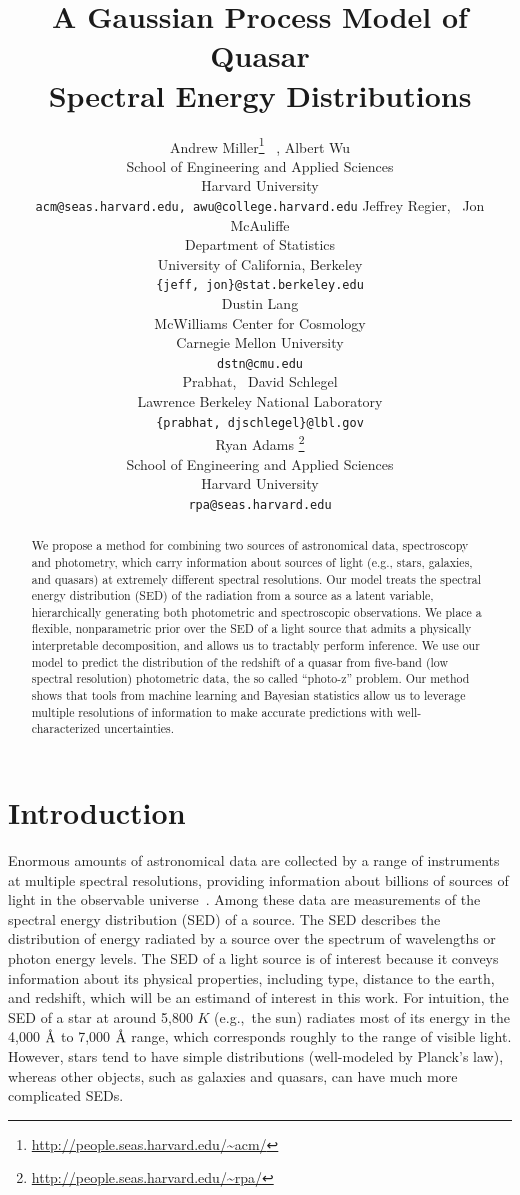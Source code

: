 \documentclass{article} %
\title{A Gaussian Process Model of Quasar \\ Spectral Energy Distributions}
\author{
Andrew Miller\thanks{\url{http://people.seas.harvard.edu/\~acm/}} \, ,  Albert Wu \\
School of Engineering and Applied Sciences\\
Harvard University\\
\texttt{acm@seas.harvard.edu, awu@college.harvard.edu}
\And
Jeffrey Regier, \, Jon McAuliffe \\
Department of Statistics \\
University of California, Berkeley \\
\texttt{\{jeff, jon\}@stat.berkeley.edu} \\
\And
Dustin Lang \\
McWilliams Center for Cosmology \\
Carnegie Mellon University \\
\texttt{dstn@cmu.edu} \\
\And
Prabhat, \, David Schlegel \\
Lawrence Berkeley National Laboratory \\
\texttt{\{prabhat, djschlegel\}@lbl.gov} \\
\And
Ryan Adams \thanks{\url{http://people.seas.harvard.edu/\~rpa/}}\\
School of Engineering and Applied Sciences\\
Harvard University\\
\texttt{rpa@seas.harvard.edu} \\
}
\begin{document}
\maketitle

\begin{abstract} 
We propose a method for combining two sources of astronomical data, spectroscopy and photometry, which carry information about sources of light (e.g., stars, galaxies, and quasars) at extremely different spectral resolutions. 
Our model treats the spectral energy distribution (SED) of the radiation from a source as a latent variable, hierarchically generating both photometric and spectroscopic observations.  
We place a flexible, nonparametric prior over the SED of a light source that admits a physically interpretable decomposition, and allows us to tractably perform inference.  
We use our model to predict the distribution of the redshift of a quasar from five-band (low spectral resolution) photometric data, the so called ``photo-z'' problem. 
Our method shows that tools from machine learning and Bayesian statistics allow us to leverage multiple resolutions of information to make accurate predictions with well-characterized uncertainties. 
\end{abstract} 

\section{Introduction}
Enormous amounts of astronomical data are collected by a range of instruments at multiple spectral resolutions, providing information about billions of sources of light in the observable universe~\cite{alam2015eleventh, martin2005galex}.  
Among these data are measurements of the spectral energy distribution (SED) of a source.  
The SED describes the distribution of energy radiated by a source over the spectrum of wavelengths or photon energy levels.
The SED of a light source is of interest because it conveys information about its physical properties, including type, distance to the earth, and redshift, which will be an estimand of interest in this work. 
For intuition, the SED of a star at around 5,800 $K$ (e.g.,~the sun) radiates most of its energy in the 4,000 $\textup{\AA}$ to 7,000 $\textup{\AA}$ range, which corresponds roughly to the range of visible light.  
However, stars tend to have simple distributions (well-modeled by Planck's law), whereas other objects, such as galaxies and quasars, can have much more complicated SEDs.  
\end{document}
